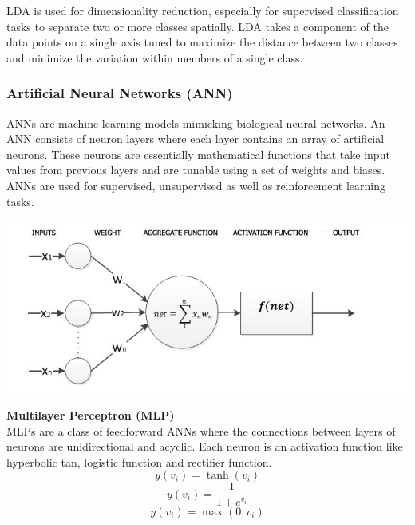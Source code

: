 \documentclass[a4paper, 12pt]{article}
\begin{document}
\noindent LDA is used for dimensionality reduction, especially for supervised classification tasks to separate two or more classes spatially. LDA takes a component of the data points on a single axis tuned to maximize the distance between two classes and minimize the variation within members of a single class.

\vskip 0.2in
\subsubsection{Artificial Neural Networks (ANN)}

\noindent ANNs are machine learning models mimicking biological neural networks. An ANN consists of neuron layers where each layer contains an array of artificial neurons. These neurons are essentially mathematical functions that take input values from previous layers and are tunable using a set of weights and biases. ANNs are used for supervised, unsupervised as well as reinforcement learning tasks.

\begin{center}
\includegraphics[scale=0.65]{ann - paper.png}
\label{fig:ann}
\end{center}

\vskip 0.2in
\noindent\textbf{Multilayer Perceptron (MLP)} \\
\noindent MLPs are a class of feedforward ANNs where the connections between layers of neurons are unidirectional and acyclic. Each neuron is an activation function like hyperbolic tan, logistic function and rectifier function.
\begin{equation}
    y(v_i) = \tanh(v_i)
\end{equation}
\begin{equation}
    y(v_i) = \frac{1}{1 + e^{v_i}}
\end{equation}
\begin{equation}
    y(v_i) = \max(0, v_i)
\end{equation}
\end{document}
